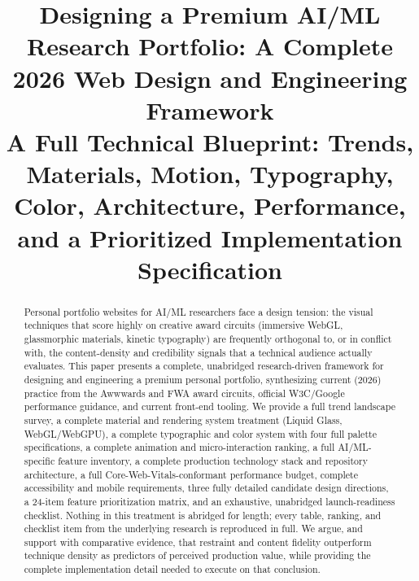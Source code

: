 \documentclass[conference]{IEEEtran}
\begin{document}
\title{Designing a Premium AI/ML Research Portfolio: A Complete 2026 Web Design and Engineering Framework\\
\large A Full Technical Blueprint: Trends, Materials, Motion, Typography, Color, Architecture, Performance, and a Prioritized Implementation Specification}

\author{
}

\maketitle

\begin{abstract}
Personal portfolio websites for AI/ML researchers face a design tension: the visual techniques that score highly on creative award circuits (immersive WebGL, glassmorphic materials, kinetic typography) are frequently orthogonal to, or in conflict with, the content-density and credibility signals that a technical audience actually evaluates. This paper presents a complete, unabridged research-driven framework for designing and engineering a premium personal portfolio, synthesizing current (2026) practice from the Awwwards and FWA award circuits, official W3C/Google performance guidance, and current front-end tooling. We provide a full trend landscape survey, a complete material and rendering system treatment (Liquid Glass, WebGL/WebGPU), a complete typographic and color system with four full palette specifications, a complete animation and micro-interaction ranking, a full AI/ML-specific feature inventory, a complete production technology stack and repository architecture, a full Core-Web-Vitals-conformant performance budget, complete accessibility and mobile requirements, three fully detailed candidate design directions, a 24-item feature prioritization matrix, and an exhaustive, unabridged launch-readiness checklist. Nothing in this treatment is abridged for length; every table, ranking, and checklist item from the underlying research is reproduced in full. We argue, and support with comparative evidence, that restraint and content fidelity outperform technique density as predictors of perceived production value, while providing the complete implementation detail needed to execute on that conclusion.
\end{abstract}
\end{document}
